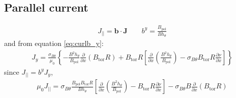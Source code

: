 \documentclass[12pt]{article}
\newcommand{\sbt}{\ensuremath{\sigma_{B\theta}}}
\newcommand{\deriv}[2]{\ensuremath{\frac{\partial #1}{\partial #2}}}
\newcommand{\hthe}{\ensuremath{h_\theta}}
\newcommand{\Bp}{\ensuremath{B_{\text{pol}}}}
\newcommand{\Bt}{\ensuremath{B_{\text{tor}}}}
\newcommand{\ve}[1]{\ensuremath{\boldsymbol{#1}}}
\newcommand{\bvec}{\ve{b}}
\newcommand{\Jvec}{\ve{J}}
\begin{document}
\subsection{Parallel current}
%
\begin{align*}
J_{||} = \bvec\cdot\Jvec \qquad b^y = \frac{\Bp}{B\hthe}
\end{align*}
%
and from equation \ref{eq:curlb_y}:
%
\begin{align*}
J_y = \frac{\sbt}{\mu_0}\left\{-\frac{B^2\hthe}{\Bp}\deriv{}{x}\left(\Bt
R\right) + \Bt R\left[\deriv{}{x}\left(\frac{B^2\hthe}{\Bp}\right) - \sbt\Bt
R\deriv{\nu}{x}\right]\right\}
\end{align*}
%
since $J_{||} = b^yJ_y$,
%
\begin{align*}
\mu_0 J_{||} =\sbt\frac{\Bp\Bt
R}{B\hthe}\left[\deriv{}{x}\left(\frac{B^2\hthe}{\Bp}\right) - \Bt
R\deriv{\nu}{x}\right] - \sbt B\deriv{}{x}\left(\Bt R\right)
\end{align*}
%
\end{document}
